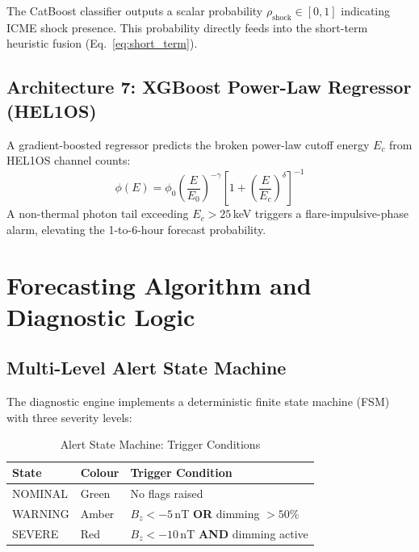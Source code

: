 \documentclass[conference,10pt,twocolumn]{IEEEtran}
\begin{document}
The CatBoost classifier outputs a scalar probability $\rho_{\text{shock}} \in [0,1]$ indicating ICME shock presence. This probability directly feeds into the short-term heuristic fusion (Eq.~\ref{eq:short_term}).

\subsection{Architecture 7: XGBoost Power-Law Regressor (HEL1OS)}
A gradient-boosted regressor \cite{b31} predicts the broken power-law cutoff energy $E_c$ from HEL1OS channel counts:
\begin{equation}
\phi(E) = \phi_0 \left(\frac{E}{E_0}\right)^{-\gamma} \left[1 + \left(\frac{E}{E_c}\right)^{\delta}\right]^{-1}
\label{eq:powerlaw}
\end{equation}
A non-thermal photon tail exceeding $E_c > 25$\,keV triggers a flare-impulsive-phase alarm, elevating the 1-to-6-hour forecast probability.

\section{Forecasting Algorithm and Diagnostic Logic}

\subsection{Multi-Level Alert State Machine}
The diagnostic engine implements a deterministic finite state machine (FSM) with three severity levels:

\begin{table}[htbp]
\caption{Alert State Machine: Trigger Conditions}
\begin{center}
\renewcommand{\arraystretch}{1.25}
\begin{tabular}{@{}l l p{4.3cm}@{}}
\toprule
\textbf{State} & \textbf{Colour} & \textbf{Trigger Condition} \\
\midrule
NOMINAL  & Green  & No flags raised \\
WARNING  & Amber  & $B_z < -5$\,nT \textbf{OR} dimming $>50\%$ \\
SEVERE   & Red    & $B_z < -10$\,nT \textbf{AND} dimming active \\
\bottomrule
\end{tabular}
\label{tab:fsm}
\end{center}
\end{table}
\end{document}
